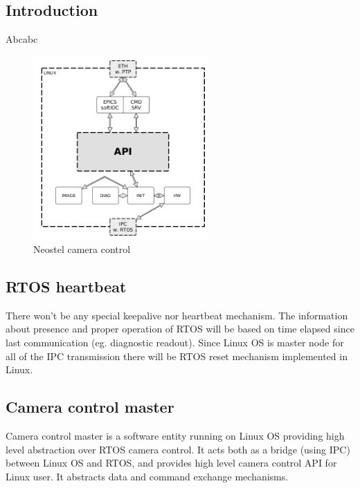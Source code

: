 
\subsection{Introduction}
Abcabc

\begin{figure}[H]
\centering
\includegraphics[width=0.6\textwidth]{pict/linux_over.png}
\caption{Neostel camera control}
\label{fig:oses}
\end{figure}

\subsection{RTOS heartbeat}
There won't be any special keepalive nor heartbeat mechanism. The information about presence and proper operation of RTOS will be based on time elapsed since last communication (eg. diagnostic readout). Since Linux OS is master node for all of the IPC transmission there will be RTOS reset mechanism implemented in Linux.

\subsection{Camera control master }
Camera control master is a software entity running on Linux OS providing high level abstraction over RTOS camera control. It acts both as a bridge (using IPC) between Linux OS and RTOS, and provides high level camera control API for Linux user. It abstracts data and command exchange mechanisms.

